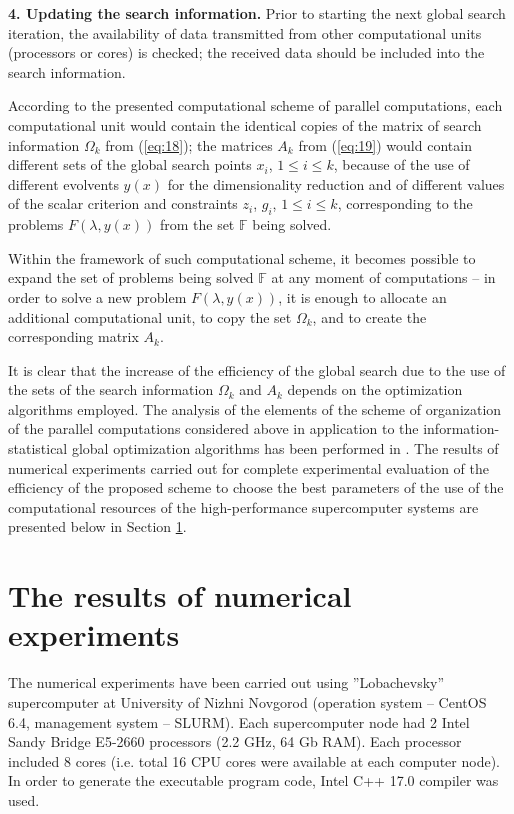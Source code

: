 \documentclass{svproc}
\begin{document}
\textbf{4. Updating the search information.} Prior to starting the next global search iteration, the availability of data transmitted from other computational units (processors or cores) is checked; the received data should be included into the search information.

According to the presented computational scheme of parallel computations, each computational unit would contain the identical copies of the matrix of search information $\Omega_k$ from (\ref{eq:18}); the matrices $A_k$ from (\ref{eq:19}) would contain different sets of the global search points $x_i$, $1\leq i\leq k$, because of the use of different evolvents $y(x)$ for the dimensionality reduction and of different values of the scalar criterion and constraints $z_i$, $g_i$, $1\leq i\leq k$, corresponding to the problems $F(\lambda,y(x))$ from the set $\mathbb{F}$ being solved.

Within the framework of such computational scheme, it becomes possible to expand the set of problems being solved $\mathbb{F}$ at any moment of computations -- in order to solve a new problem $F(\lambda,y(x))$, it is enough to allocate an additional computational unit, to copy the set $\Omega_k$, and to create the corresponding matrix $A_k$.

It is clear that the increase of the efficiency of the global search due to the use of the sets of the search information $\Omega_k$ and $A_k$ depends on the optimization algorithms employed. The analysis of the elements of the scheme of organization of the parallel computations considered above in application to the information-statistical global optimization algorithms has been performed in \cite{x12,x13,x14,x15,x16,x17}. The results of numerical experiments carried out for complete experimental evaluation of the efficiency of the proposed scheme to choose the best parameters of the use of the computational resources of the high-performance supercomputer systems are presented below in Section \ref{sec:06}.



\section{The results of numerical experiments }
\label{sec:06}

The numerical experiments have been carried out using ''Lobachevsky'' supercomputer at University of Nizhni Novgorod (operation system -- CentOS 6.4, management system -- SLURM). Each supercomputer node had 2 Intel Sandy Bridge E5-2660 processors (2.2 GHz, 64 Gb RAM). Each processor included 8 cores (i.e. total 16 CPU cores were available at each computer node). In order to generate the executable program code, Intel C++ 17.0 compiler was used.
\end{document}
